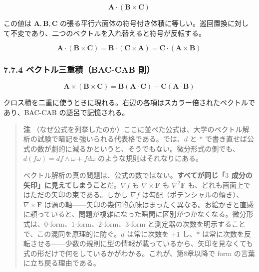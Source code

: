\documentclass[a4paper,12pt,openany]{book}
\begin{document}
\[\mathbf{A} \cdot (\mathbf{B} \times \mathbf{C})\]

この値は \(\mathbf{A}, \mathbf{B}, \mathbf{C}\)
の張る平行六面体の符号付き体積に等しい。巡回置換に対して不変であり、二つのベクトルを入れ替えると符号が反転する。

\[\mathbf{A} \cdot (\mathbf{B} \times \mathbf{C}) = \mathbf{B} \cdot (\mathbf{C} \times \mathbf{A}) = \mathbf{C} \cdot (\mathbf{A} \times \mathbf{B})\]

\hypertarget{ux30d9ux30afux30c8ux30ebux4e09ux91cdux7a4dbac-cab-ux5247}{%
\subsubsection{7.7.4 ベクトル三重積（BAC-CAB
則）}\label{ux30d9ux30afux30c8ux30ebux4e09ux91cdux7a4dbac-cab-ux5247}}

\[\mathbf{A} \times (\mathbf{B} \times \mathbf{C}) = \mathbf{B}(\mathbf{A} \cdot \mathbf{C}) - \mathbf{C}(\mathbf{A} \cdot \mathbf{B})\]

クロス積を二重に使うときに現れる。右辺の各項はスカラー倍されたベクトルであり、BAC-CAB
の語呂で記憶される。

\begin{quote}
\textbf{注}
（なぜ公式を列挙したのか）ここに並べた公式は、大学のベクトル解析の試験で暗記を強いられる代表格である。では、\(d\)
と \(\ast\)
で書き直せば公式の数が劇的に減るかというと、そうでもない。微分形式の側でも、\(d(f\omega) = df\wedge\omega + f d\omega\)
のような規則はそれなりにある。

ベクトル解析の真の問題は、公式の数ではない。\textbf{すべてが同じ「$3$ 成分の矢印」に見えてしまうこと}だ。\(\nabla f\)
も \(\nabla \times \mathbf{F}\) も \(\nabla^2\mathbf{F}\)
も、どれも画面上ではただの矢印の束である。しかし \(\nabla f\)
は勾配（ポテンシャルの傾き）、\(\nabla \times \mathbf{F}\)
は渦の軸——矢印の幾何的意味はまったく異なる。お絵かきと直感に頼っていると、問題が複雑になった瞬間に区別がつかなくなる。微分形式は、\(0\)-form、\(1\)-form、\(2\)-form、\(3\)-form
と測定器の次数を明示することで、この混同を原理的に防ぐ。\(d\)
は常に次数を \(+1\) し、\(\ast\)
は常に次数を反転させる——少数の規則に型の情報が載っているから、矢印を見なくても式の形だけで何をしているかがわかる。これが、第8章以降で
form の言葉に立ち戻る理由である。
\end{quote}
\end{document}
